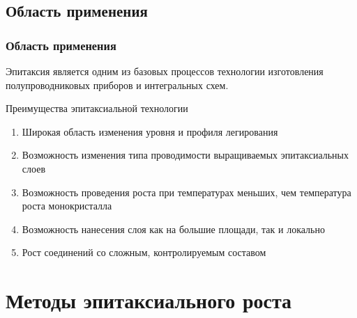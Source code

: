 \documentclass[10pt,pdf,hyperref={unicode}, dvipsnames]{beamer}
\begin{document}
\subsection{Область применения}
\begin{frame}[t]
	\frametitle{Область применения}
	Эпитаксия является одним из базовых процессов технологии изготовления полупроводниковых приборов и интегральных
	схем.
	\vspace{20pt}

	Преимущества эпитаксиальной технологии
	\begin{enumerate}
		\item Широкая область изменения уровня и профиля легирования 
		\item Возможность изменения типа проводимости выращиваемых эпитаксиальных слоев
		\item Возможность проведения роста при температурах меньших, чем температура роста монокристалла
		\item Возможность нанесения слоя как на большие площади, так и локально
		\item Рост соединений со сложным, контролируемым составом
	\end{enumerate}

\end{frame}



\section{Методы эпитаксиального роста}
\end{document}
